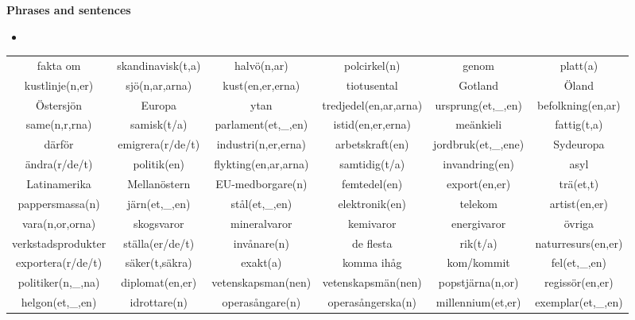 
\begin{flushleft}
    \textbf{Phrases and sentences}
    \begin{itemize}
        \item 
    \end{itemize}
\end{flushleft}

\begin{center}
    \begin{adjustwidth}{-2.7cm}{}
        \begin{tabular}{|c c c c c c|}
            \hline
            fakta om & skandinavisk(t,a) & halvö(n,ar) & polcirkel(n) & genom & platt(a) \\
            kustlinje(n,er) & sjö(n,ar,arna) & kust(en,er,erna) & tiotusental & Gotland & Öland \\
            Östersjön & Europa & ytan & tredjedel(en,ar,arna) & ursprung(et,\_,en) & befolkning(en,ar) \\
            same(n,r,rna) & samisk(t/a) & parlament(et,\_,en) & istid(en,er,erna) & meänkieli & fattig(t,a) \\
            därför & emigrera(r/de/t) & industri(n,er,erna) & arbetskraft(en) & jordbruk(et,\_,ene) & Sydeuropa \\
            ändra(r/de/t) & politik(en) & flykting(en,ar,arna) & samtidig(t/a) & invandring(en) & asyl \\
            Latinamerika & Mellanöstern & EU-medborgare(n) & femtedel(en) & export(en,er) & trä(et,t) \\
            pappersmassa(n) & järn(et,\_,en) & stål(et,\_,en) & elektronik(en) & telekom & artist(en,er) \\
            vara(n,or,orna) & skogsvaror & mineralvaror & kemivaror & energivaror & övriga \\
            verkstadsprodukter & ställa(er/de/t) & invånare(n) & de flesta & rik(t/a) & naturresurs(en,er) \\
            exportera(r/de/t) & säker(t,säkra) & exakt(a) & komma ihåg & kom/kommit & fel(et,\_,en) \\
            politiker(n,\_,na) & diplomat(en,er) & vetenskapsman(nen) & vetenskapsmän(nen) & popstjärna(n,or) & regissör(en,er) \\
            helgon(et,\_,en) & idrottare(n) & operasångare(n) & operasångerska(n) & millennium(et,er) & exemplar(et,\_,en) \\

\end{tabular}
\end{adjustwidth}
\end{center}
